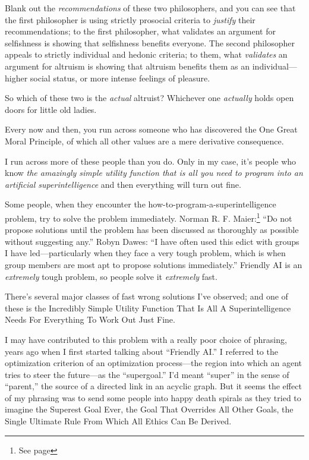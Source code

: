  Blank out the \textit{recommendations} of these two philosophers,
and you can see that the first philosopher is using strictly prosocial
criteria to \textit{justify} their recommendations; to the first
philosopher, what validates an argument for selfishness is showing that
selfishness benefits everyone. The second philosopher appeals to
strictly individual and hedonic criteria; to them, what
\textit{validates} an argument for altruism is showing that altruism
benefits them as an individual---higher social status, or more intense
feelings of pleasure.


 So which of these two is the \textit{actual} altruist? Whichever
one \textit{actually} holds open doors for little old ladies.

\myendsectiontext



 Every now and then, you run across someone who has discovered the
One Great Moral Principle, of which all other values are a mere
derivative consequence. 

{
 I run across more of these people than you do. Only in my case,
it's people who know \textit{the amazingly simple
utility function that is all you need to program into an artificial
superintelligence} and then everything will turn out fine.}


 Some people, when they encounter the
how-to-program-a-superintelligence problem, try to solve the problem
immediately. Norman R. F. Maier:\footnote{See page \pageref{robyn_dawes_comment}} ``Do not propose
solutions until the problem has been discussed as thoroughly as
possible without suggesting any.'' Robyn Dawes:
``I have often used this edict with groups I have
led---particularly when they face a very tough problem, which is when
group members are most apt to propose solutions
immediately.'' Friendly AI is an \textit{extremely}
tough problem, so people solve it \textit{extremely} fast.


 There's several major classes of fast wrong
solutions I've observed; and one of these is the
Incredibly Simple Utility Function That Is All A Superintelligence
Needs For Everything To Work Out Just Fine.


 I may have contributed to this problem with a really poor choice
of phrasing, years ago when I first started talking about
``Friendly AI.'' I referred to the
optimization criterion of an optimization process---the region into
which an agent tries to steer the future---as the
``supergoal.'' I'd
meant ``super'' in the sense of
``parent,'' the source of a directed
link in an acyclic graph. But it seems the effect of my phrasing was to
send some people into happy death spirals as they tried to imagine the
Superest Goal Ever, the Goal That Overrides All Other Goals, the Single
Ultimate Rule From Which All Ethics Can Be Derived.


